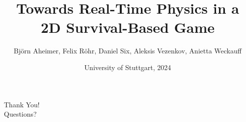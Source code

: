 \documentclass{beamer}
\title{Towards Real-Time Physics in a 2D Survival-Based Game}
\author{Björn Aheimer, Felix Röhr, Daniel Six, Aleksis Vezenkov, Anietta Weckauff}
\date{University of Stuttgart, 2024}
\begin{document}
\begin{frame}
    \titlepage
\end{frame}









\begin{frame}
    \centering
    \Huge Thank You! \\
    \vspace{1cm}
    \Large Questions?
\end{frame}
\end{document}
